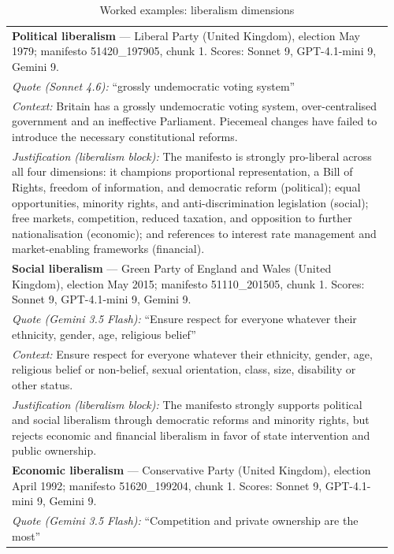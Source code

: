 {\footnotesize
\begin{longtable}{p{0.96\linewidth}}
\caption{Worked examples: liberalism dimensions}\label{tab:oa9c} \\
\toprule
\textbf{Political liberalism} --- Liberal Party (United Kingdom), election May 1979; manifesto 51420\_197905, chunk 1. Scores: Sonnet 9, GPT-4.1-mini 9, Gemini 9. \\
\quad \emph{Quote (Sonnet 4.6):} ``grossly undemocratic voting system'' \\
\quad \emph{Context:} Britain has a grossly undemocratic voting system, over-centralised government and an ineffective Parliament. Piecemeal changes have failed to introduce the necessary constitutional reforms. \\
\quad \emph{Justification (liberalism block):} The manifesto is strongly pro-liberal across all four dimensions: it champions proportional representation, a Bill of Rights, freedom of information, and democratic reform (political); equal opportunities, minority rights, and anti-discrimination legislation (social); free markets, competition, reduced taxation, and opposition to further nationalisation (economic); and references to interest rate management and market-enabling frameworks (financial). \\
\midrule
\textbf{Social liberalism} --- Green Party of England and Wales (United Kingdom), election May 2015; manifesto 51110\_201505, chunk 1. Scores: Sonnet 9, GPT-4.1-mini 9, Gemini 9. \\
\quad \emph{Quote (Gemini 3.5 Flash):} ``Ensure respect for everyone whatever their ethnicity, gender, age, religious belief'' \\
\quad \emph{Context:} Ensure respect for everyone whatever their ethnicity, gender, age, religious belief or non-belief, sexual orientation, class, size, disability or other status. \\
\quad \emph{Justification (liberalism block):} The manifesto strongly supports political and social liberalism through democratic reforms and minority rights, but rejects economic and financial liberalism in favor of state intervention and public ownership. \\
\midrule
\textbf{Economic liberalism} --- Conservative Party (United Kingdom), election April 1992; manifesto 51620\_199204, chunk 1. Scores: Sonnet 9, GPT-4.1-mini 9, Gemini 9. \\
\quad \emph{Quote (Gemini 3.5 Flash):} ``Competition and private ownership are the most'' \\

\end{longtable}}
